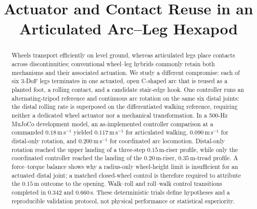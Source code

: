 \documentclass[letterpaper,10pt,conference]{ieeeconf}
\title{\LARGE \bf
Actuator and Contact Reuse in an Articulated Arc--Leg Hexapod}
\author{\mbox{}}
\begin{document}
\maketitle
\thispagestyle{empty}
\pagestyle{empty}

\begin{abstract}
Wheels transport efficiently on level ground, whereas articulated legs place
contacts across discontinuities; conventional wheel--leg hybrids commonly retain
both mechanisms and their associated actuation. We study a different compromise:
each of six 3-DoF legs terminates in one actuated, open C-shaped arc that is
reused as a planted foot, a rolling contact, and a candidate stair-edge hook.
One controller runs an alternating-tripod reference and continuous arc rotation
on the same six distal joints: the distal rolling rate is superposed on the
differentiated walking reference, requiring neither a dedicated wheel actuator
nor a mechanical transformation. In a 500-Hz MuJoCo development model, an
as-implemented controller comparison at a commanded $0.18\,\mathrm{m\,s^{-1}}$
yielded $0.117\,\mathrm{m\,s^{-1}}$ for articulated walking,
$0.090\,\mathrm{m\,s^{-1}}$ for distal-only rotation, and
$0.200\,\mathrm{m\,s^{-1}}$ for coordinated arc locomotion. Distal-only
rotation reached the upper landing of a three-step $0.15\,\mathrm{m}$-riser
profile, while only the coordinated controller reached the landing of the
$0.20\,\mathrm{m}$-riser, $0.35\,\mathrm{m}$-tread profile. A force--torque
balance shows why a radius-only wheel-height limit is insufficient for an
actuated distal joint; a matched closed-wheel control is therefore required to
attribute the $0.15\,\mathrm{m}$ outcome to the opening. Walk--roll and
roll--walk control transitions completed in $0.342$ and $0.660\,\mathrm{s}$.
These deterministic trials define hypotheses and a reproducible validation
protocol, not physical performance or statistical superiority.
\end{abstract}











\end{document}
